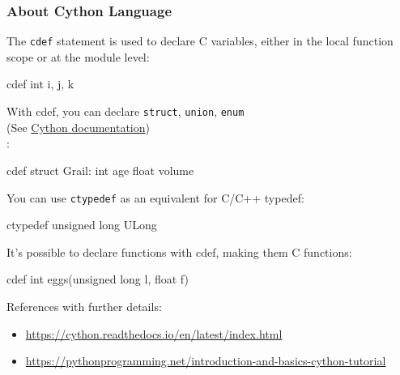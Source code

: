 \documentclass[
]{article}
\newenvironment{Shaded}{}{}
\newcommand{\BuiltInTok}[1]{#1}
\newcommand{\NormalTok}[1]{#1}
\begin{document}
\hypertarget{about-cython-language}{%
\subsubsection{About Cython Language}\label{about-cython-language}}

The \texttt{cdef} statement is used to declare C variables, either in
the local function scope or at the module level:

\begin{Shaded}
\begin{Highlighting}[]
\NormalTok{cdef }\BuiltInTok{int}\NormalTok{ i, j, k}
\end{Highlighting}
\end{Shaded}

With cdef, you can declare \texttt{struct}, \texttt{union},
\texttt{enum}\\
(See
\href{https://cython.readthedocs.io/en/latest/src/userguide/language_basics.html\#structs-unions-enums}{Cython
documentation})\\
:

\begin{Shaded}
\begin{Highlighting}[]
\NormalTok{cdef struct Grail:     }
  \BuiltInTok{int}\NormalTok{ age     }
  \BuiltInTok{float}\NormalTok{ volume}
\end{Highlighting}
\end{Shaded}

You can use \texttt{ctypedef} as an equivalent for C/C++ typedef:

\begin{Shaded}
\begin{Highlighting}[]
\NormalTok{ctypedef unsigned long ULong}
\end{Highlighting}
\end{Shaded}

It's possible to declare functions with cdef, making them C functions:

\begin{Shaded}
\begin{Highlighting}[]
\NormalTok{cdef }\BuiltInTok{int}\NormalTok{ eggs(unsigned }\BuiltInTok{long}\NormalTok{ l, }\BuiltInTok{float}\NormalTok{ f)}
\end{Highlighting}
\end{Shaded}

References with further details:

\begin{itemize}
\item
  \url{https://cython.readthedocs.io/en/latest/index.html}
\item
  \url{https://pythonprogramming.net/introduction-and-basics-cython-tutorial}
\end{itemize}
\end{document}
